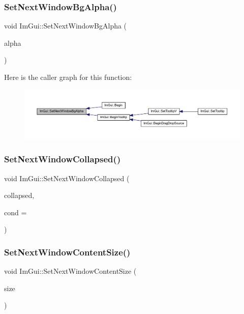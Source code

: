 \subsubsection{\texorpdfstring{Set\+Next\+Window\+Bg\+Alpha()}{SetNextWindowBgAlpha()}}
{\footnotesize\ttfamily void Im\+Gui\+::\+Set\+Next\+Window\+Bg\+Alpha (\begin{DoxyParamCaption}\item[{float}]{alpha }\end{DoxyParamCaption})}

Here is the caller graph for this function\+:
\nopagebreak
\begin{figure}[H]
\begin{center}
\leavevmode
\includegraphics[width=350pt]{namespace_im_gui_a7de5a63cec4babe417f972403db6430c_icgraph}
\end{center}
\end{figure}
\mbox{\label{namespace_im_gui_a3e9380e253a3c49665a404e56950a52a}} 
\subsubsection{\texorpdfstring{Set\+Next\+Window\+Collapsed()}{SetNextWindowCollapsed()}}
{\footnotesize\ttfamily void Im\+Gui\+::\+Set\+Next\+Window\+Collapsed (\begin{DoxyParamCaption}\item[{bool}]{collapsed,  }\item[{\mbox{\hyperlink{imgui_8h_aef890d6ac872e12c5804d0b3e4f7f103}{Im\+Gui\+Cond}}}]{cond = {} }\end{DoxyParamCaption})}

\mbox{\label{namespace_im_gui_aae55a58c38d8e84b10eb1e8b1531372d}} 
\subsubsection{\texorpdfstring{Set\+Next\+Window\+Content\+Size()}{SetNextWindowContentSize()}}
{\footnotesize\ttfamily void Im\+Gui\+::\+Set\+Next\+Window\+Content\+Size (\begin{DoxyParamCaption}\item[{const \mbox{\hyperlink{struct_im_vec2}{Im\+Vec2}} \&}]{size }\end{DoxyParamCaption})}

